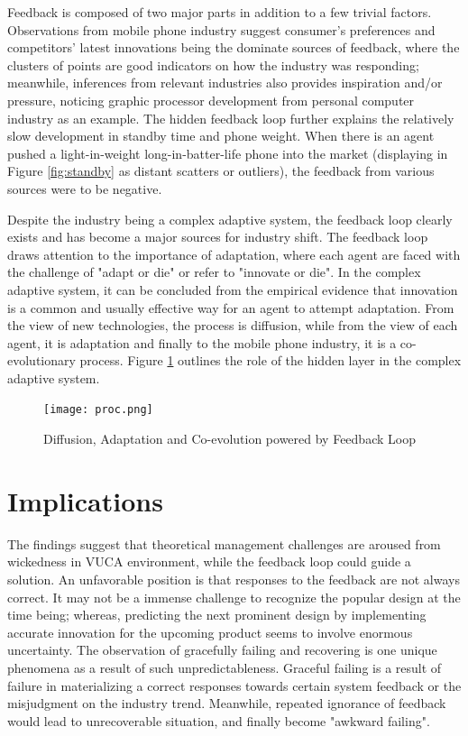 \documentclass[utf8,english]{gradu3}
\begin{document}
Feedback is composed of two major parts in addition to a few trivial factors. Observations from mobile phone industry suggest consumer's preferences and competitors' latest innovations being the dominate sources of feedback, where the clusters of points are good indicators on how the industry was responding; meanwhile, inferences from relevant industries also provides inspiration and/or pressure, noticing graphic processor development from personal computer industry as an example. The hidden feedback loop further explains the relatively slow development in standby time and phone weight. When there is an agent pushed a light-in-weight long-in-batter-life phone into the market (displaying in Figure \ref{fig:standby} as distant scatters or outliers), the feedback from various sources were to be negative. 

Despite the industry being a complex adaptive system, the feedback loop clearly exists and has become a major sources for industry shift. The feedback loop draws attention to the importance of adaptation, where each agent are faced with the challenge of "adapt or die" or refer to "innovate or die". In the complex adaptive system, it can be concluded from the empirical evidence that innovation is a common and usually effective way for an agent to attempt adaptation. From the view of new technologies, the process is diffusion, while from the view of each agent, it is adaptation and finally to the mobile phone industry, it is a co-evolutionary process. Figure \ref{fig:proc} outlines the role of the hidden layer in the complex adaptive system.

\begin{figure}[htb]
    \centering
    \texttt{[image: proc.png]}
    \caption{Diffusion, Adaptation and Co-evolution powered by Feedback Loop}
    \label{fig:proc}
\end{figure}

\chapter{Implications}

The findings suggest that theoretical management challenges are aroused from wickedness in VUCA environment, while the feedback loop could guide a solution. An unfavorable position is that responses to the feedback are not always correct. It may not be a immense challenge to recognize the popular design at the time being; whereas, predicting the next prominent design by implementing accurate innovation for the upcoming product seems to involve enormous uncertainty. The observation of gracefully failing and recovering is one unique phenomena as a result of such unpredictableness. Graceful failing is a result of failure in materializing a correct responses towards certain system feedback or the misjudgment on the industry trend. Meanwhile, repeated ignorance of feedback would lead to unrecoverable situation, and finally become "awkward failing".
\end{document}
